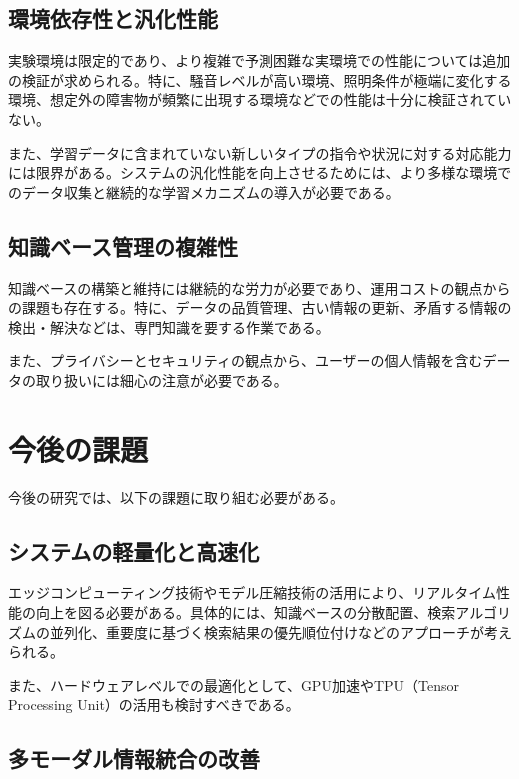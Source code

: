 \documentclass[12pt]{report}
\begin{document}
\subsection{環境依存性と汎化性能}
\label{subsec:generalization_issues}

実験環境は限定的であり、より複雑で予測困難な実環境での性能については追加の検証が求められる。特に、騒音レベルが高い環境、照明条件が極端に変化する環境、想定外の障害物が頻繁に出現する環境などでの性能は十分に検証されていない。

また、学習データに含まれていない新しいタイプの指令や状況に対する対応能力には限界がある。システムの汎化性能を向上させるためには、より多様な環境でのデータ収集と継続的な学習メカニズムの導入が必要である。

\subsection{知識ベース管理の複雑性}
\label{subsec:knowledge_base_management}

知識ベースの構築と維持には継続的な労力が必要であり、運用コストの観点からの課題も存在する。特に、データの品質管理、古い情報の更新、矛盾する情報の検出・解決などは、専門知識を要する作業である。

また、プライバシーとセキュリティの観点から、ユーザーの個人情報を含むデータの取り扱いには細心の注意が必要である。

\section{今後の課題}
\label{sec:future_work}

今後の研究では、以下の課題に取り組む必要がある。

\subsection{システムの軽量化と高速化}
\label{subsec:optimization}

エッジコンピューティング技術やモデル圧縮技術の活用により、リアルタイム性能の向上を図る必要がある。具体的には、知識ベースの分散配置、検索アルゴリズムの並列化、重要度に基づく検索結果の優先順位付けなどのアプローチが考えられる。

また、ハードウェアレベルでの最適化として、GPU加速やTPU（Tensor Processing Unit）の活用も検討すべきである。

\subsection{多モーダル情報統合の改善}
\label{subsec:multimodal_integration}
\end{document}
